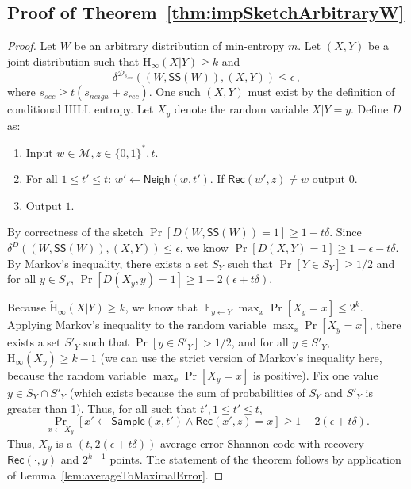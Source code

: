 \documentclass[11pt]{article}
\newcommand{\thref}[1]{\mbox{Theorem~\ref{#1}}}
\newcommand{\lemref}[1]{\mbox{Lemma~\ref{#1}}}
\DeclareMathOperator*{\expe}{\mathbb{E}}
\newcommand{\class}[1]{{\ensuremath{\mathsf{#1}}}}
\newcommand{\sketch}{\ensuremath{\class{SS}}\xspace}
\newcommand{\rec}{\ensuremath{\class{Rec}}\xspace}
\newcommand{\sample}{\ensuremath{\class{Sample}}\xspace}
\newcommand{\neigh}{\ensuremath{\class{Neigh}}\xspace}
\newcommand{\hill}{\ensuremath{\mathtt{HILL}}\xspace}
\newcommand{\Hoo}{\mathrm{H}_\infty}
\newcommand{\Hav}{\tilde{\mathrm{H}}_\infty}
\begin{document}
\subsection{Proof of \thref{thm:impSketchArbitraryW}}
\label{sec:proof of thm sketch implies code}
\begin{proof}
  Let $W$ be an arbitrary distribution of min-entropy $m$.  Let $(X, Y)$ be a joint distribution such that $\Hav(X | Y)\geq k$ and
\[ 
\delta^{\mathcal{D}_{s_{sec}}}((W, \sketch(W)), (X, Y))\le \epsilon\, ,
\]  
where  $s_{sec} \geq t(s_{neigh}+s_{rec})$.  One such $(X, Y)$ must exist by the definition of conditional HILL entropy. Let $X_y$ denote the random variable $X|Y=y$.
Define $D$ as:
\begin{enumerate}
\item Input $w\in\mathcal{M}, z \in\{0, 1\}^*, t$.
\item For all $1\leq t'\leq t$: 
\subitem  $w'\leftarrow \neigh(w, t')$.
\subitem If $\rec(w', z) \neq  w$ output $0$.
\item Output $1$.
\end{enumerate}
 By correctness of the sketch $ \Pr[D(W, \sketch(W)) =1]\ge 1-t\delta$.  Since 
$\delta^D((W, \sketch(W)), (X, Y))\le \epsilon$, we know $\Pr[D(X, Y) = 1]\ge 1-\epsilon-t\delta$.  By Markov's inequality,  there exists a set $S_Y$ such that $\Pr[Y\in S_Y]\ge 1/2$ and for all $y\in S_Y$, $\Pr[ D(X_y, y) =1]\ge 1- 2(\epsilon + t\delta)$.  

Because $\Hav(X | Y)\geq k$, we know that $\expe_{y\leftarrow Y} \max_x \Pr[X_y=x]\leq 2^k$.  Applying Markov's inequality to the random variable $\max_x \Pr[X_y=x]$, there exists a set $S'_Y$ such that $\Pr[y\in S'_Y]> 1/2$, and for all $y\in S'_Y$, $\Hoo(X_y)\ge k-1$ (we can use the strict version of Markov's inequality here, because the random variable $\max_x \Pr[X_y=x]$ is positive).  Fix one value $y \in S_Y\cap S'_Y$ (which exists because the sum of probabilities of $S_Y$ and $S'_Y$ is greater than 1).  
Thus, for all such that $t', 1\leq t'\leq t$, 
\[ \Pr_{x\leftarrow X_y}[x'\leftarrow \sample(x, t') \wedge \rec(x',z) = x]\ge  1-2(\epsilon+t\delta).\]  
Thus,  $X_y$ is a $(t, 2(\epsilon+t\delta))$-average error Shannon code with recovery $\rec(\cdot,y)$ and $2^{k-1}$ points.  The statement of the theorem follows by application of \lemref{lem:averageToMaximalError}.  
\end{proof}
\end{document}
